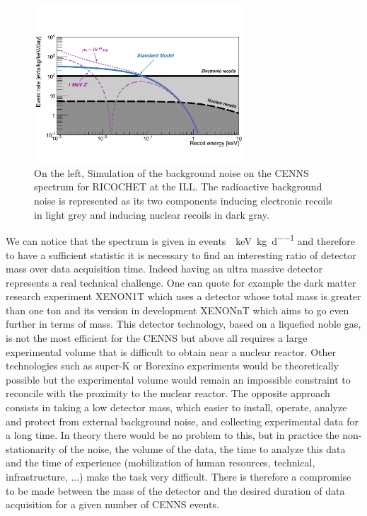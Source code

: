 \begin{figure}
\centering
\includegraphics[width=0.7\textwidth]{Figures/Introduction/cenns_spectrum_ill.pdf}
\caption{On the left, Simulation of the background noise on the CENNS spectrum for RICOCHET at the ILL. The radioactive background noise is represented as its two components inducing electronic recoils in light grey and inducing nuclear recoils in dark gray.}
\label{fig:cenns-new-physics}
\end{figure}

We can notice that the spectrum is given in \si{events \per \kilo\eV \per \kg \per \day} and therefore to have a sufficient statistic it is necessary to find an interesting ratio of detector mass over data acquisition time.
Indeed having an ultra massive detector represents a real technical challenge. One can quote for example the dark matter research experiment XENON1T which uses a detector whose total mass is greater than one ton and its version in development XENONnT which aims to go even further in terms of mass. This detector technology, based on a liquefied noble gas, is not the most efficient for the CENNS but above all requires a large experimental volume that is difficult to obtain near a nuclear reactor.
Other technologies such as super-K or Borexino experiments would be theoretically possible but the experimental volume would remain an impossible constraint to reconcile with the proximity to the nuclear reactor.
The opposite approach consists in taking a low detector mass, which easier to install, operate, analyze and protect from external background noise, and collecting experimental data for a long time. In theory there would be no problem to this, but in practice the non-stationarity of the noise, the volume of the data, the time to analyze this data and the time of experience (mobilization of human resources, technical, infrastructure, ...) make the task very difficult. There is therefore a compromise to be made between the mass of the detector and the desired duration of data acquisition for a given number of CENNS events.

